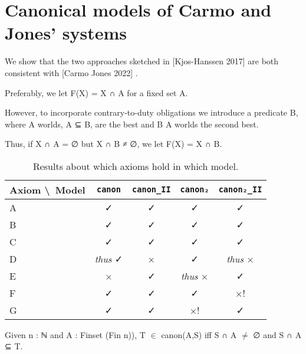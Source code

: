 \section{Canonical models of Carmo and Jones' systems}

We show that the two approaches sketched in [Kjos-Hanssen 2017] are both consistent with [Carmo Jones 2022]
\cite{MR4500520}.

Preferably, we let F(X) = X ∩ A for a fixed set A.

However, to incorporate contrary-to-duty obligations we introduce a predicate B,
where A worlds, A ⊆ B, are the best and B \setminus A worlds the second best.

Thus, if X ∩ A = ∅ but X ∩ B ≠ ∅, we let F(X) = X ∩ B.



\begin{table}[h]
    \centering
    \begin{tabular}{lcccc}
        \toprule
        Axiom \textbackslash\ Model & \texttt{canon} & \texttt{canon\_II} & \texttt{canon₂} & \texttt{canon₂\_II} \\
        \midrule
        A & ✓ & ✓ & ✓ & ✓ \\
        B & ✓ & ✓ & ✓ & ✓ \\
        C & ✓ & ✓ & ✓ & ✓ \\
        D & \textit{thus} ✓ & × & ✓ & \textit{thus} × \\
        E & × & ✓ & \textit{thus} × & ✓ \\
        F & ✓ & ✓ & ✓ & ×! \\
        G & ✓ & ✓ & ×! & ✓ \\
        \bottomrule
    \end{tabular}
    \caption{Results about which axioms hold in which model.}
    \label{tab:example}
\end{table}

\begin{definition}
	\leanok
Given n : ℕ and A : Finset (Fin n)),
T $\in$ canon(A,S) iff S ∩ A $\ne$ ∅ and S ∩ A ⊆ T.
\end{definition}



